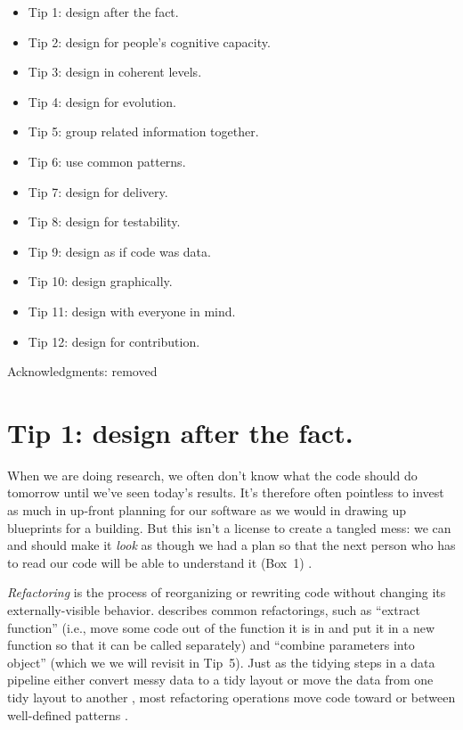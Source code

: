 \documentclass[10pt,letterpaper]{article}
\begin{document}
\begin{itemize}
  \itemsep0em
  \item[] Tip 1: design after the fact.
  \item[] Tip 2: design for people's cognitive capacity.
  \item[] Tip 3: design in coherent levels.
  \item[] Tip 4: design for evolution.
  \item[] Tip 5: group related information together.
  \item[] Tip 6: use common patterns.
  \item[] Tip 7: design for delivery.
  \item[] Tip 8: design for testability.
  \item[] Tip 9: design as if code was data.
  \item[] Tip 10: design graphically.
  \item[] Tip 11: design with everyone in mind.
  \item[] Tip 12: design for contribution.
\end{itemize}

\colorbox{green!30}{Acknowledgments: removed}

\section*{Tip 1: design after the fact.}

When we are doing research,
we often don't know what the code should do tomorrow
until we've seen today's results.
It's therefore often pointless to invest as much in up-front planning for our software
as we would in drawing up blueprints for a building.
But this isn't a license to create a tangled mess:
we can and should make it \emph{look} as though we had a plan
so that the next person who has to read our code will be able to understand it \colorbox{green!30}{(Box~1)} \cite{Parnas1986}.

\emph{Refactoring} is the process of reorganizing or rewriting code
without changing its externally-visible behavior.
\cite{Fowler2018} describes common refactorings,
such as ``extract function''
(i.e., move some code out of the function it is in
and put it in a new function so that it can be called separately)
and ``combine parameters into object''
(which we we will revisit in Tip~5).
Just as the tidying steps in a data pipeline
either convert messy data to a tidy layout or move the data from one tidy layout to another \cite{Wickham2017},
most refactoring operations move code toward or between well-defined patterns \cite{Kerievsky2004}.
\end{document}
